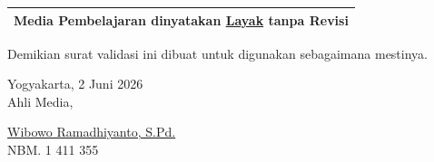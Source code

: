 \vspace{0.2cm}

\begin{center}
    \begin{tabular}{c}
        \hline
        \textbf{Media Pembelajaran dinyatakan \underline{Layak} tanpa Revisi} \\
        \hline
    \end{tabular}
\end{center}

\vspace{0.3cm}

\noindent Demikian surat validasi ini dibuat untuk digunakan sebagaimana mestinya.

\vspace{0.8cm}

\begin{flushright}
    \begin{minipage}{0.5\textwidth}
        \raggedright
        Yogyakarta, 2 Juni 2026 \\
        Ahli Media,
        
        \vspace{1.2cm}
        
        \underline{Wibowo Ramadhiyanto, S.Pd.} \\
        NBM. 1 411 355
    \end{minipage}
\end{flushright}
